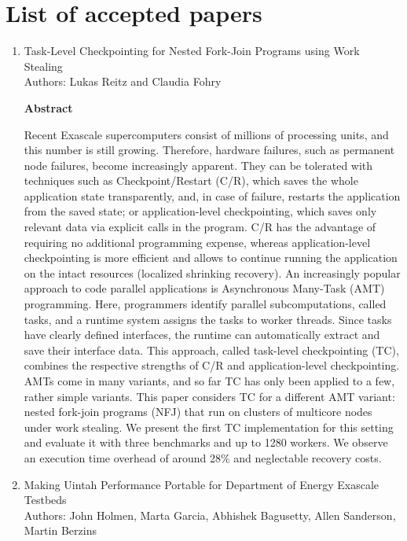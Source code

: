 \documentclass{article}
\begin{document}
\section{List of accepted papers}


\begin{enumerate}
    \item Task-Level Checkpointing for Nested Fork-Join Programs using Work Stealing \\
    Authors: Lukas Reitz and Claudia Fohry
    \begin{center}
        \textbf{Abstract}
    \end{center}
Recent Exascale supercomputers consist of millions of processing units, and this number is still growing. Therefore, hardware failures, such as permanent node failures, become increasingly apparent. They can be tolerated with techniques such as Checkpoint/Restart (C/R), which saves the whole application state transparently, and, in case of failure, restarts the application from the saved state; or application-level checkpointing, which saves only relevant data via explicit calls in the program. C/R has the advantage of requiring no additional programming expense, whereas application-level checkpointing is more efficient and allows to continue running the application on the intact resources (localized shrinking recovery). An increasingly popular approach to code parallel applications is Asynchronous Many-Task (AMT) programming. Here, programmers identify parallel subcomputations, called tasks, and a runtime system assigns the tasks to worker threads. Since tasks have clearly defined interfaces, the runtime can automatically extract and save their interface data. This approach, called task-level checkpointing (TC), combines the respective strengths of C/R and application-level checkpointing. AMTs come in many variants, and so far TC has only been applied to a few, rather simple variants. This paper considers TC for a different AMT variant: nested fork-join programs (NFJ) that run on clusters of multicore nodes under work stealing. We present the first TC implementation for this setting and evaluate it with three benchmarks and up to 1280 workers. We observe an execution time overhead of around 28\% and neglectable recovery costs.
    \item Making Uintah Performance Portable for Department of Energy Exascale Testbeds \\
    Authors: John Holmen, Marta Garcia, Abhishek Bagusetty, Allen Sanderson, Martin Berzins
    \begin{center}

\end{center}
\end{enumerate}
\end{document}
